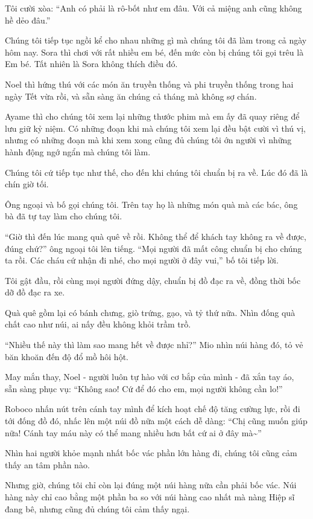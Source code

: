 \documentclass[../main.tex]{subfiles}
\begin{document}
Tôi cười xòa: ``Anh có phải là rô-bốt như em đâu. Với cả miệng anh cũng không hề dẻo đâu.''

Chúng tôi tiếp tục ngồi kể cho nhau những gì mà chúng tôi đã làm trong cả ngày hôm nay. Sora thì chơi với rất nhiều em bé, đến mức còn bị chúng tôi gọi trêu là Em bé. Tất nhiên là Sora không thích điều đó.

Noel thì hứng thú với các món ăn truyền thống và phi truyền thống trong hai ngày Tết vừa rồi, và sẵn sàng ăn chúng cả tháng mà không sợ chán.

Ayame thì cho chúng tôi xem lại những thước phim mà em ấy đã quay riêng để lưu giữ kỷ niệm. Có những đoạn khi mà chúng tôi xem lại đều bật cười vì thú vị, nhưng có những đoạn mà khi xem xong cũng đủ chúng tôi ớn người vì những hành động ngớ ngẩn mà chúng tôi làm.

Chúng tôi cứ tiếp tục như thế, cho đến khi chúng tôi chuẩn bị ra về. Lúc đó đã là chín giờ tối.

Ông ngoại và bố gọi chúng tôi. Trên tay họ là những món quà mà các bác, ông bà đã tự tay làm cho chúng tôi.

``Giờ thì đến lúc mang quà quê về rồi. Không thể để khách tay không ra về được, đúng chứ?'' ông ngoại tôi lên tiếng. ``Mọi người đã mất công chuẩn bị cho chúng ta rồi. Các cháu cứ nhận đi nhé, cho mọi người ở đây vui,'' bố tôi tiếp lời.

Tôi gật đầu, rồi cùng mọi người đứng dậy, chuẩn bị đồ đạc ra về, đồng thời bốc dỡ đồ đạc ra xe.

Quà quê gồm lại có bánh chưng, giò trứng, gạo, và tỷ thứ nữa. Nhìn đống quà chất cao như núi, ai nấy đều không khỏi trầm trồ.

``Nhiều thế này thì làm sao mang hết về được nhỉ?'' Mio nhìn núi hàng đó, tỏ vẻ băn khoăn đến độ đổ mồ hôi hột.

May mắn thay, Noel - người luôn tự hào với cơ bắp của mình - đã xắn tay áo, sẵn sàng phục vụ: ``Không sao! Cứ để đó cho em, mọi người không cần lo!''

Roboco nhấn nút trên cánh tay mình để kích hoạt chế độ tăng cường lực, rồi đi tới đống đồ đó, nhấc lên một núi đồ nữa một cách dễ dàng: ``Chị cũng muốn giúp nữa! Cánh tay máu này có thể mang nhiều hơn bất cứ ai ở đây mà\~{}''

Nhìn hai người khỏe mạnh nhất bốc vác phần lớn hàng đi, chúng tôi cũng cảm thấy an tâm phần nào.

Nhưng giờ, chúng tôi chỉ còn lại đúng một núi hàng nữa cần phải bốc vác. Núi hàng này chỉ cao bằng một phần ba so với núi hàng cao nhất mà nàng Hiệp sĩ đang bê, nhưng cũng đủ chúng tôi cảm thấy ngại.
\end{document}
